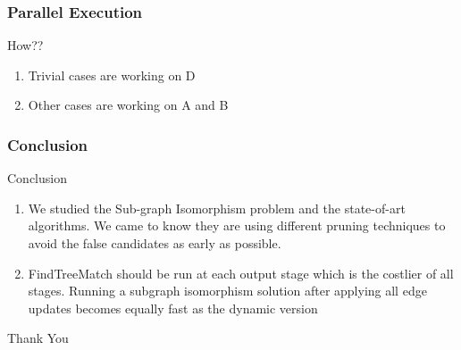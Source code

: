 \documentclass{beamer}
\begin{document}
\begin{frame}
\frametitle{Parallel Execution }
\begin{block}{How??}
\begin{enumerate}
\item Trivial cases are working on D
\item Other cases are working on A and B
\end{enumerate}

\end{block}
\end{frame}


\begin{frame}
\frametitle{Conclusion }
\begin{block}{Conclusion}
\begin{enumerate}
\item We studied the Sub-graph Isomorphism problem and the state-of-art algorithms. We came to know they are using different pruning techniques to avoid the false candidates as early as possible. 
\item FindTreeMatch should be run at each output stage which is the costlier of all stages. Running a subgraph isomorphism solution after applying all edge updates becomes equally fast as the dynamic version
\end{enumerate}

\end{block}
\end{frame}





\begin{frame}
	
\color{violet} \Huge{\centerline{Thank You}}
\end{frame}
\end{document}
